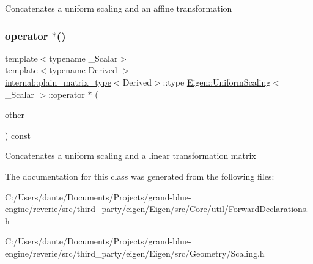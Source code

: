 Concatenates a uniform scaling and an affine transformation \mbox{\label{class_eigen_1_1_uniform_scaling_abec8e8c16a306e1fe7658467b64ac257}} 
\subsubsection{\texorpdfstring{operator $\ast$()}{operator *()}\hspace{0.1cm}{\footnotesize\ttfamily [4/4]}}
{\footnotesize\ttfamily template$<$typename \+\_\+\+Scalar$>$ \\
template$<$typename Derived $>$ \\
\mbox{\hyperlink{struct_eigen_1_1internal_1_1plain__matrix__type}{internal\+::plain\+\_\+matrix\+\_\+type}}$<$Derived$>$\+::type \mbox{\hyperlink{class_eigen_1_1_uniform_scaling}{Eigen\+::\+Uniform\+Scaling}}$<$ \+\_\+\+Scalar $>$\+::operator $\ast$ (\begin{DoxyParamCaption}\item[{const \mbox{\hyperlink{class_eigen_1_1_matrix_base}{Matrix\+Base}}$<$ Derived $>$ \&}]{other }\end{DoxyParamCaption}) const\hspace{0.3cm}{\ttfamily [inline]}}

Concatenates a uniform scaling and a linear transformation matrix 

The documentation for this class was generated from the following files\+:\begin{DoxyCompactItemize}
\item 
C\+:/\+Users/dante/\+Documents/\+Projects/grand-\/blue-\/engine/reverie/src/third\+\_\+party/eigen/\+Eigen/src/\+Core/util/Forward\+Declarations.\+h\item 
C\+:/\+Users/dante/\+Documents/\+Projects/grand-\/blue-\/engine/reverie/src/third\+\_\+party/eigen/\+Eigen/src/\+Geometry/Scaling.\+h\end{DoxyCompactItemize}
